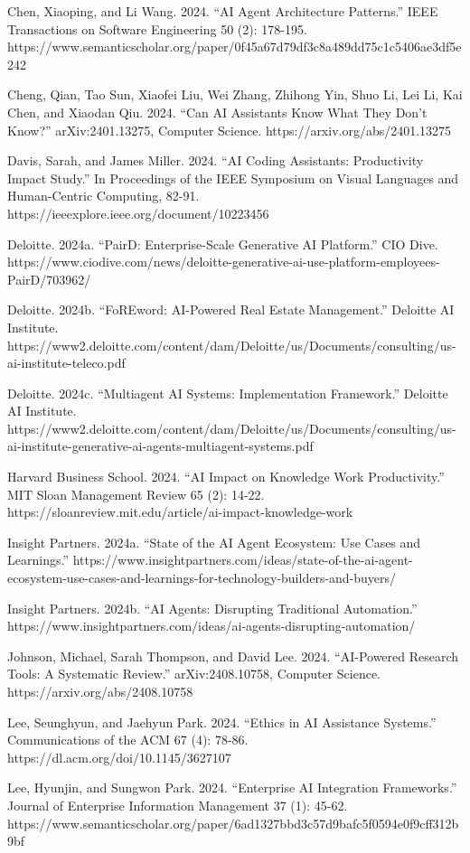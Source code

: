 \documentclass[
]{article}
\begin{document}
Chen, Xiaoping, and Li Wang. 2024. ``AI Agent Architecture Patterns.''
IEEE Transactions on Software Engineering 50 (2): 178-195.
https://www.semanticscholar.org/paper/0f45a67d79df3c8a489dd75c1c5406ae3df5e242

Cheng, Qian, Tao Sun, Xiaofei Liu, Wei Zhang, Zhihong Yin, Shuo Li, Lei
Li, Kai Chen, and Xiaodan Qiu. 2024. ``Can AI Assistants Know What They
Don't Know?'' arXiv:2401.13275, Computer Science.
https://arxiv.org/abs/2401.13275

Davis, Sarah, and James Miller. 2024. ``AI Coding Assistants:
Productivity Impact Study.'' In Proceedings of the IEEE Symposium on
Visual Languages and Human-Centric Computing, 82-91.
https://ieeexplore.ieee.org/document/10223456

Deloitte. 2024a. ``PairD: Enterprise-Scale Generative AI Platform.'' CIO
Dive.
https://www.ciodive.com/news/deloitte-generative-ai-use-platform-employees-PairD/703962/

Deloitte. 2024b. ``FoREword: AI-Powered Real Estate Management.''
Deloitte AI Institute.
https://www2.deloitte.com/content/dam/Deloitte/us/Documents/consulting/us-ai-institute-teleco.pdf

Deloitte. 2024c. ``Multiagent AI Systems: Implementation Framework.''
Deloitte AI Institute.
https://www2.deloitte.com/content/dam/Deloitte/us/Documents/consulting/us-ai-institute-generative-ai-agents-multiagent-systems.pdf

Harvard Business School. 2024. ``AI Impact on Knowledge Work
Productivity.'' MIT Sloan Management Review 65 (2): 14-22.
https://sloanreview.mit.edu/article/ai-impact-knowledge-work

Insight Partners. 2024a. ``State of the AI Agent Ecosystem: Use Cases
and Learnings.''
https://www.insightpartners.com/ideas/state-of-the-ai-agent-ecosystem-use-cases-and-learnings-for-technology-builders-and-buyers/

Insight Partners. 2024b. ``AI Agents: Disrupting Traditional
Automation.''
https://www.insightpartners.com/ideas/ai-agents-disrupting-automation/

Johnson, Michael, Sarah Thompson, and David Lee. 2024. ``AI-Powered
Research Tools: A Systematic Review.'' arXiv:2408.10758, Computer
Science. https://arxiv.org/abs/2408.10758

Lee, Seunghyun, and Jaehyun Park. 2024. ``Ethics in AI Assistance
Systems.'' Communications of the ACM 67 (4): 78-86.
https://dl.acm.org/doi/10.1145/3627107

Lee, Hyunjin, and Sungwon Park. 2024. ``Enterprise AI Integration
Frameworks.'' Journal of Enterprise Information Management 37 (1):
45-62.
https://www.semanticscholar.org/paper/6ad1327bbd3c57d9bafc5f0594e0f9cff312b9bf
\end{document}
